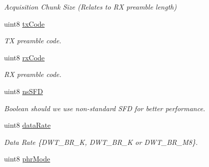 \begin{DoxyCompactItemize}
\begin{DoxyCompactList}\small\item\em Acquisition Chunk Size (Relates to R\-X preamble length) \end{DoxyCompactList}\item 
\hypertarget{struct____attribute_____a99fbb55517b0b7c3ed564eedfca5324b}{uint8 \hyperlink{struct____attribute_____a99fbb55517b0b7c3ed564eedfca5324b}{tx\-Code}}\label{struct____attribute_____a99fbb55517b0b7c3ed564eedfca5324b}

\begin{DoxyCompactList}\small\item\em T\-X preamble code. \end{DoxyCompactList}\item 
\hypertarget{struct____attribute_____aac286da1a9d55d3b36d3fac574ac89e4}{uint8 \hyperlink{struct____attribute_____aac286da1a9d55d3b36d3fac574ac89e4}{rx\-Code}}\label{struct____attribute_____aac286da1a9d55d3b36d3fac574ac89e4}

\begin{DoxyCompactList}\small\item\em R\-X preamble code. \end{DoxyCompactList}\item 
\hypertarget{struct____attribute_____a7c575a4c97dc35eddea54e23080a65f1}{uint8 \hyperlink{struct____attribute_____a7c575a4c97dc35eddea54e23080a65f1}{ns\-S\-F\-D}}\label{struct____attribute_____a7c575a4c97dc35eddea54e23080a65f1}

\begin{DoxyCompactList}\small\item\em Boolean should we use non-\/standard S\-F\-D for better performance. \end{DoxyCompactList}\item 
\hypertarget{struct____attribute_____a92ca4d9ae50ee39f6ec1b97239b315af}{uint8 \hyperlink{struct____attribute_____a92ca4d9ae50ee39f6ec1b97239b315af}{data\-Rate}}\label{struct____attribute_____a92ca4d9ae50ee39f6ec1b97239b315af}

\begin{DoxyCompactList}\small\item\em Data Rate \{D\-W\-T\-\_\-\-B\-R\-\_\-K, D\-W\-T\-\_\-\-B\-R\-\_\-K or D\-W\-T\-\_\-\-B\-R\-\_\-M8\}. \end{DoxyCompactList}\item 
\hypertarget{struct____attribute_____ad6bff10c6fe4da9d69634136323a7d59}{uint8 \hyperlink{struct____attribute_____ad6bff10c6fe4da9d69634136323a7d59}{phr\-Mode}}\label{struct____attribute_____ad6bff10c6fe4da9d69634136323a7d59}


\end{DoxyCompactItemize}
